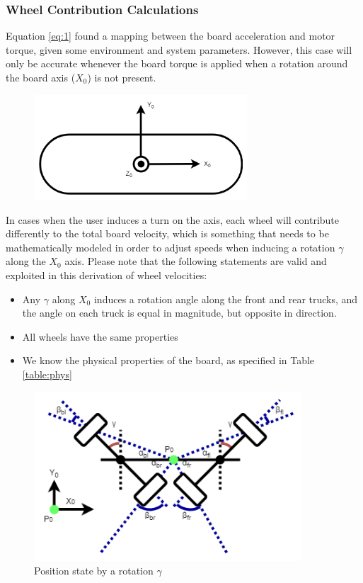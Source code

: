 \documentclass[titlepage, letterpaper,12pt]{article}
\begin{document}
\subsubsection{Wheel Contribution Calculations}
Equation \ref{eq:1} found a mapping between the board acceleration and motor torque, given some environment and system parameters. However, this case will only be accurate whenever the board torque is applied when a rotation around the board axis ($X _{0}$) is not present.

\begin{figure}[h]
\includegraphics[width=8cm]{figs/Board_Axis.png}
\centering
\end{figure}

In cases when the user induces a turn on the axis, each wheel will contribute differently to the total board velocity, which is something that needs to be mathematically modeled in order to adjust speeds when inducing a rotation $\gamma$ along the $X _{0}$ axis. Please note that the following statements are valid and exploited in this derivation of wheel velocities:
\begin{itemize}
    \item Any $\gamma$ along $X _{0}$ induces a rotation angle along the front and rear trucks, and the angle on each truck is equal in magnitude, but opposite in direction.
    \item All wheels have the same properties
    \item We know the physical properties of the board, as specified in Table \ref{table:phys}
\end{itemize}

\begin{figure}[!h]
\caption{Position state by a rotation $\gamma$}
\includegraphics[width=10cm]{figs/Wheel_Reps.png}
\centering
\end{figure}
\end{document}
